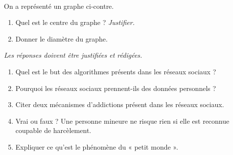 \documentclass[11pt]{article}
\begin{document}
\begin{exo}[$2$ points]~\\[-1.5cm]
  \begin{minipage}{.5\textwidth}
    On a représenté un graphe ci-contre.
    \begin{enumerate}
      \item Quel est le centre du graphe ? \emph{Justifier.}
      \item Donner le diamètre du graphe.
    \end{enumerate}
  \end{minipage}
  \begin{minipage}{.5\textwidth}
\end{minipage}
\end{exo}

\begin{exo}[$5$ points]
  \emph{Les réponses doivent être justifiées et rédigées.}
  \begin{enumerate}
    \item Quel est le but des algorithmes présents dans les réseaux sociaux ?
    \item Pourquoi les réseaux sociaux prennent-ils des données personnels ?
    \item Citer deux mécanismes d'addictions présent dans les réseaux sociaux.
    \item Vrai ou faux ? Une personne mineure ne risque rien si elle est
      reconnue coupable de harcèlement.
    \item Expliquer ce qu'est le phénomène du « petit monde ».
  \end{enumerate}
\end{exo}
\end{document}
